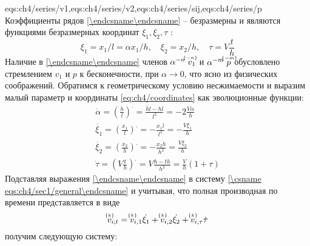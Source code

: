 \expandafter\gdef\csname eqs:ch4/series\endcsname{eqs:ch4/series/v1,eqs:ch4/series/v2,eqs:ch4/series/sij,eqs:ch4/series/p}
Коэффициенты рядов \cref{\csname eqs:ch4/series\endcsname} -- безразмерны и являются функциями безразмерных координат $\xi_1, \xi_2, \tau$ :
\begin{equation}
  \label{eq:ch4/coordinates}
  \xi_1 = x_1 / l = \alpha x_1 / h, \quad \xi_2 = x_2 / h, \quad \tau = V \frac{t}{h}
\end{equation}
Наличие в \cref{\csname eqs:ch4/series\endcsname} членов $\alpha^{-n} \; \uindex{v}{-n}_{1}$ и $\alpha^{-m} \; \uindex{p}{-m}$ обусловлено стремлением $v_{1}$ и $p$ к бесконечности, при $\alpha\rightarrow 0$, что ясно из физических соображений.
Обратимся к геометрическому условию несжимаемости и выразим малый параметр и координаты \cref{eq:ch4/coordinates} как эволюционные функции:
\begingroup
\allowdisplaybreaks
\begin{gather}
  \dot{\alpha} = \left(\frac{h}{l}\right)^. = \frac{\dot{h}l - h\dot{l}}{l^2} = -2\frac{V\alpha}{h}
  \\
  \dot{\xi_1} = \left(\frac{x_1}{l}\right)^. = -\frac{x_1 \dot{l}}{l^2} = -\frac{V\xi_1}{h}
  \\
  \dot{\xi_2} = \left(\frac{x_2}{h}\right)^. = -\frac{x_2 \dot{h}}{h^2} = \frac{V\xi_2}{h}
  \\
  \dot{\tau} = \left(V \frac{t}{h}\right)^. = V \frac{h - t\dot{h}}{h^2} = \frac{V}{h} \left(1+\tau\right)
\end{gather}
\endgroup
Подставляя выражения \cref{\csname eqs:ch4/series\endcsname} в систему \cref{\csname eqs:ch4/sec1/general\endcsname} и учитывая, что полная производная по времени представляется в виде
\begin{equation*}
  \uindex{v}{k}_{i;t} = \uindex{v}{k}_{i,1} \dot{\xi_{1}} + \uindex{v}{k}_{i,2} \dot{\xi_{2}} + \uindex{v}{k}_{i,\tau} \dot{\tau}
\end{equation*}
получим следующую систему:
\begingroup
\allowdisplaybreaks
